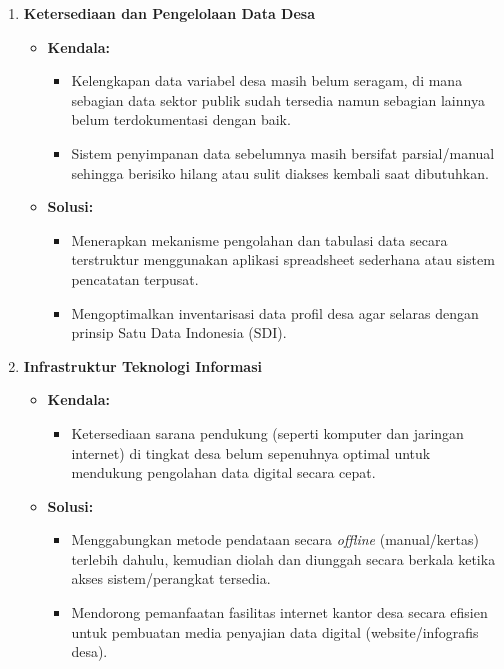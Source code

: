\begin{enumerate}[label=\textbf{\textcolor{bpsnavy}{\arabic*.}}]
  \item \textbf{Ketersediaan dan Pengelolaan Data Desa}
  \begin{itemize}
    \item \textbf{\textcolor{ribbonred}{Kendala:}}
    \begin{itemize}
      \item Kelengkapan data variabel desa masih belum seragam, di mana sebagian data sektor publik sudah tersedia namun sebagian lainnya belum terdokumentasi dengan baik.
      \item Sistem penyimpanan data sebelumnya masih bersifat parsial/manual sehingga berisiko hilang atau sulit diakses kembali saat dibutuhkan.
    \end{itemize}
    \item \textbf{\textcolor{bpsgreen}{Solusi:}}
    \begin{itemize}
      \item Menerapkan mekanisme pengolahan dan tabulasi data secara terstruktur menggunakan aplikasi spreadsheet sederhana atau sistem pencatatan terpusat.
      \item Mengoptimalkan inventarisasi data profil desa agar selaras dengan prinsip Satu Data Indonesia (SDI).
    \end{itemize}
  \end{itemize}

  \item \textbf{Infrastruktur Teknologi Informasi}
  \begin{itemize}
    \item \textbf{\textcolor{ribbonred}{Kendala:}}
    \begin{itemize}
      \item Ketersediaan sarana pendukung (seperti komputer dan jaringan internet) di tingkat desa belum sepenuhnya optimal untuk mendukung pengolahan data digital secara cepat.
    \end{itemize}
    \item \textbf{\textcolor{bpsgreen}{Solusi:}}
    \begin{itemize}
      \item Menggabungkan metode pendataan secara \textit{offline} (manual/kertas) terlebih dahulu, kemudian diolah dan diunggah secara berkala ketika akses sistem/perangkat tersedia.
      \item Mendorong pemanfaatan fasilitas internet kantor desa secara efisien untuk pembuatan media penyajian data digital (website/infografis desa).
    \end{itemize}
  \end{itemize}


\end{enumerate}
